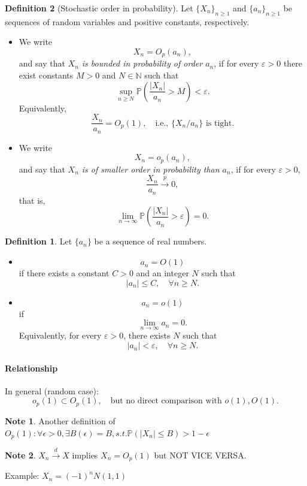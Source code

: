 \documentclass[11pt]{article}
\theoremstyle{definition}
\newtheorem{defn}{Definition}[section]
\newtheorem{note}{Note}[section]
\begin{document}
\begin{defn}[Stochastic order in probability]
Let $\{X_n\}_{n\ge1}$ and $\{a_n\}_{n\ge1}$ be sequences of random variables and positive constants, respectively.

\begin{itemize}
\item We write
\[
X_n = O_p(a_n),
\]
and say that \emph{$X_n$ is bounded in probability of order $a_n$}, if for every $\varepsilon > 0$ there exist constants $M > 0$ and $N \in \mathbb{N}$ such that
\[
\sup_{n \ge N} 
\mathbb{P}\!\left( \frac{|X_n|}{a_n} > M \right) 
< \varepsilon.
\]
Equivalently,
\[
\frac{X_n}{a_n} = O_p(1),
\quad \text{i.e., } \{X_n/a_n\} \text{ is tight.}
\]

\item We write
\[
X_n = o_p(a_n),
\]
and say that \emph{$X_n$ is of smaller order in probability than $a_n$}, if for every $\varepsilon > 0$,
\[
\frac{X_n}{a_n} \xrightarrow{p} 0,
\]
that is,
\[
\lim_{n\to\infty} 
\mathbb{P}\!\left( \frac{|X_n|}{a_n} > \varepsilon \right) = 0.
\]
\end{itemize}
\begin{defn}
    Let $\{a_n\}$ be a sequence of real numbers.

\begin{itemize}
\item
    \[
    a_n = O(1)
    \]
    if there exists a constant $C > 0$ and an integer $N$ such that
    \[
    |a_n| \le C, \quad \forall n \ge N.
    \]

    \item
    \[
    a_n = o(1)
    \]
    if
    \[
    \lim_{n \to \infty} a_n = 0.
    \]
    Equivalently, for every $\varepsilon > 0$, there exists $N$ such that
    \[
    |a_n| < \varepsilon, \quad \forall n \ge N.
    \]
\end{itemize}

\paragraph{Relationship}
In general (random case):
    \[
    o_p(1) \subset O_p(1), \quad \text{but no direct comparison with } o(1), O(1).
    \]
\end{defn}
\end{defn}
\begin{note}
    Another definition of $O_p(1): \forall\epsilon >0, \exists B(\epsilon) = B, s.t. \mathbb{P}(|X_n|\leq B) > 1-\epsilon$
\end{note}
\begin{note}
    $X_n\xrightarrow{d}X$ implies $X_n = O_p(1)$ but NOT VICE VERSA.

    Example: $X_n = (-1)^{n}N(1,1)$
\end{note}
\end{document}
